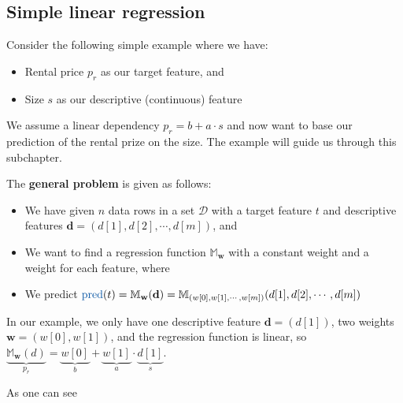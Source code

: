 \subsection{Simple linear regression}

\begin{note}
  Consider the following simple example where we have:
  \begin{itemize}
    \item Rental price $p_r$ as our target feature, and
    \item Size $s$ as our descriptive (continuous) feature
  \end{itemize}
  We assume a linear dependency $p_r = b + a \cdot s$ and now want to base our prediction of the rental prize on the size. The example will guide us through this subchapter.
\end{note}

The \textbf{general problem} is given as follows:
\begin{itemize}
  \item We have given $n$ data rows in a set $\mathcal{D}$ with a target feature $t$ and descriptive features $\mathbf{d} = (d[1], d[2], \cdots, d[m])$, and
  \item We want to find a regression function $\mathbb{M}_\mathbf{w}$ with a constant weight and a weight for each feature, where
  \item We predict $\text{\color{mathblue}pred}(t) = \mathbb{M}_\mathbf{w}(\mathbf{d}) = \mathbb{M}_{(w[0], w[1], \cdots, w[m])}(d[1], d[2], \cdots, d[m])$
\end{itemize}
\begin{note}
  In our example, we only have one descriptive feature $\mathbf{d}=(d[1])$, two weights $\mathbf{w}=(w[0], w[1])$, and the regression function is linear, so $\underbrace{\mathbb{M}_\mathbf{w}(d)}_{p_r} = \underbrace{w[0]}_{b} + \underbrace{w[1]}_{a}\cdot\underbrace{d[1]}_{s}$. 
\end{note}

As one can see 
